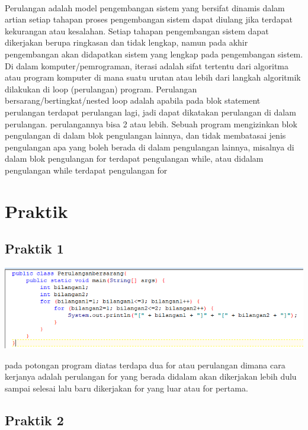 \documentclass[a4paper,12pt]{article}
\begin{document}
\paragraph{}
Perulangan adalah model pengembangan sistem yang bersifat dinamis dalam artian
setiap tahapan proses pengembangan sistem dapat diulang jika terdapat kekurangan
atau kesalahan. Setiap tahapan pengembangan sistem dapat dikerjakan berupa
ringkasan dan tidak lengkap, namun pada akhir pengembangan akan didapatkan sistem
yang lengkap pada pengembangan sistem.
Di dalam komputer/pemrograman, iterasi adalah sifat tertentu dari algoritma atau
program komputer di mana suatu urutan atau lebih dari langkah algoritmik dilakukan di
loop (perulangan) program.
Perulangan bersarang/bertingkat/nested loop adalah apabila pada blok statement
perulangan terdapat perulangan lagi, jadi dapat dikatakan perulangan di dalam
perulangan. perulangannya bisa 2 atau lebih.
Sebuah program mengizinkan blok pengulangan di dalam blok pengulangan lainnya, dan
tidak membatasai jenis pengulangan apa yang boleh berada di dalam pengulangan
lainnya, misalnya di dalam blok pengulangan for terdapat pengulangan while, atau didalam pengulangan while terdapat pengulangan for

\section{Praktik}
\subsection{Praktik 1}
\begin{center}
	\includegraphics[scale=.7]{Capture1}
\end{center}
pada potongan program diatas terdapa dua for atau perulangan dimana cara kerjanya adalah perulangan for yang berada didalam akan dikerjakan lebih dulu sampai selesai lalu baru dikerjakan for yang luar atau for pertama.

\subsection{Praktik 2}
\begin{center}
	
\end{center}
\end{document}

